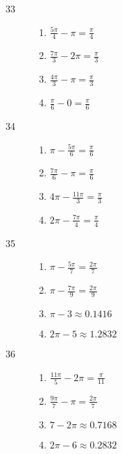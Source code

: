 \documentclass{exam}
\begin{document}
\begin{description}
      \item[33] 
        \begin{enumerate}[a]
          \item $\frac{5 \pi}{4} - \pi   = \boxed{ \frac{\pi}{4} }$
          \item $\frac{7 \pi}{3} - 2 \pi = \boxed{ \frac{\pi}{3} }$
          \item $\frac{4 \pi}{3} - \pi   = \boxed{ \frac{\pi}{3} }$
          \item $\frac{\pi}{6} - 0       = \boxed{ \frac{\pi}{6} }$
        \end{enumerate}
        
      \item[34] 
        \begin{enumerate}[a]
          \item $ \pi - \frac{5 \pi}{6}   = \boxed{ \frac{\pi}{6} }$
          \item $\frac{7 \pi}{6} - \pi    = \boxed{ \frac{\pi}{6} }$
          \item $4 \pi - \frac{11 \pi}{3} = \boxed{ \frac{\pi}{3} }$
          \item $2 \pi - \frac{7 \pi}{4}  = \boxed{ \frac{\pi}{4} }$
        \end{enumerate}
        
      \item[35] 
        \begin{enumerate}[a]
          \item $\pi - \frac{5 \pi}{7} = \boxed{ \frac{2 \pi}{7} }$
          \item $\pi - \frac{7 \pi}{9} = \boxed{ \frac{2 \pi}{9} }$
          \item $\pi - 3         \approx \boxed{ 0.1416 }$
          \item $2 \pi - 5       \approx \boxed{ 1.2832 }$
        \end{enumerate}

      \item[36] 
        \begin{enumerate}[a]
          \item $\frac{11 \pi}{5} - 2 \pi = \boxed{ \frac{\pi}{11} }$
          \item $\frac{9 \pi}{7} - \pi    = \boxed{ \frac{2 \pi}{7} }$
          \item $7 - 2 \pi          \approx \boxed{ 0.7168 }$
          \item $2 \pi - 6          \approx \boxed{ 0.2832 }$
        \end{enumerate}


\end{description}
\end{document}
